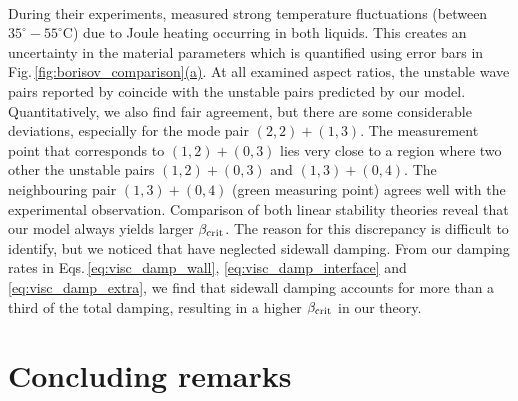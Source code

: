 \documentclass[aps,prfluids,reprint,superscriptaddress]{revtex4-2}
\begin{document}
\\
\indent During their experiments, \citet{Borisov2010} measured strong temperature fluctuations (between $35^{\circ}-55^{\circ}$C) due to Joule heating occurring in both liquids. This creates an uncertainty in the material parameters which is quantified using error bars in Fig.\,\ref{fig:borisov_comparison}\hyperref[fig:borisov_comparison]{(a)}. At all examined aspect ratios, the unstable wave pairs reported by \citet{Borisov2010} coincide with the unstable pairs predicted by our model. Quantitatively, we also find fair agreement, but there are some considerable deviations, especially for the mode pair $(2,2) + (1,3)$. The measurement point that corresponds to $(1,2) + (0,3)$ lies very close to a region where two other the unstable pairs $(1,2) + (0,3)$ and $(1,3) + (0,4)$. The neighbouring pair $(1,3) + (0,4)$ (green measuring point) agrees well with the experimental observation. Comparison of both linear stability theories reveal that our model always yields larger $\beta_{\rm crit}$. The reason for this discrepancy is difficult to identify, but we noticed that \citet{Borisov2010} have neglected sidewall damping. From our damping rates in Eqs.\,\eqref{eq:visc_damp_wall}, \eqref{eq:visc_damp_interface} and \eqref{eq:visc_damp_extra}, we find that sidewall damping accounts for more than a third of the total damping, resulting in a higher $\beta_{\rm crit}$ in our theory. 


\section{Concluding remarks}
\label{sec:discuss}
\end{document}
